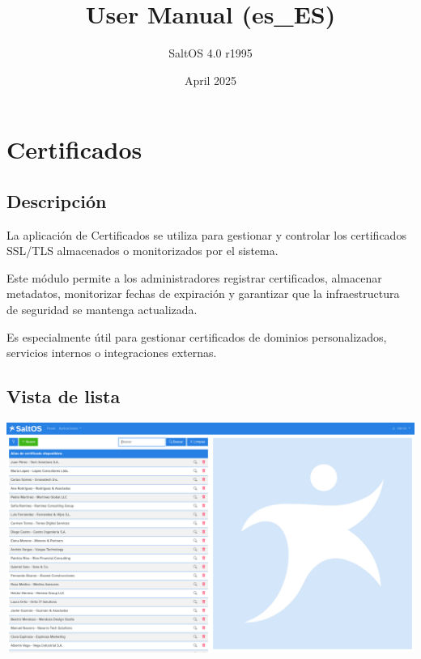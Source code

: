 \documentclass[a4paper]{article}
\title{User Manual (es\_ES)}
\author{SaltOS 4.0 r1995}
\begin{document}
\date{April 2025}
\maketitle
\clearpage

\tableofcontents
\clearpage


\hypertarget{toc1}{}
\section{Certificados}

\hypertarget{toc2}{}
\subsection{Descripción}

La aplicación de Certificados se utiliza para gestionar y controlar los certificados SSL/TLS almacenados o monitorizados por el sistema.

Este módulo permite a los administradores registrar certificados, almacenar metadatos, monitorizar fechas de expiración
y garantizar que la infraestructura de seguridad se mantenga actualizada.

Es especialmente útil para gestionar certificados de dominios personalizados, servicios internos o integraciones externas.

\hypertarget{toc3}{}
\subsection{Vista de lista}

\begin{center}\includegraphics[width=1\textwidth]{../ujest/snaps/test-screenshots-js-screenshots-certs-certs-list-es-es-1-snap.png}\end{center}
\end{document}
